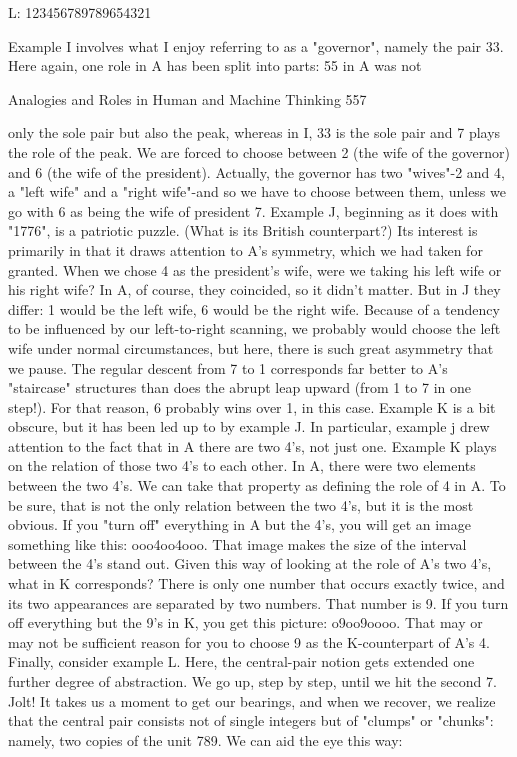        L:    123456789789654321

       Example I involves what I enjoy referring to as a "governor", namely the pair
33. Here again, one role in A has been split into parts: 55 in A was not




Analogies and Roles in Human and Machine Thinking                                  557

only the sole pair but also the peak, whereas in I, 33 is the sole pair and 7 plays the
role of the peak. We are forced to choose between 2 (the wife of the governor) and 6
(the wife of the president). Actually, the governor has two "wives"-2 and 4, a "left
wife" and a "right wife"-and so we have to choose between them, unless we go with 6
as being the wife of president 7.
        Example J, beginning as it does with "1776", is a patriotic puzzle. (What is its
British counterpart?) Its interest is primarily in that it draws attention to A's
symmetry, which we had taken for granted. When we chose 4 as the president's wife,
were we taking his left wife or his right wife? In A, of course, they coincided, so it
didn't matter. But in J they differ: 1 would be the left wife, 6 would be the right wife.
Because of a tendency to be influenced by our left-to-right scanning, we probably
would choose the left wife under normal circumstances, but here, there is such great
asymmetry that we pause. The regular descent from 7 to 1 corresponds far better to
A's "staircase" structures than does the abrupt leap upward (from 1 to 7 in one step!).
For that reason, 6 probably wins over 1, in this case.
        Example K is a bit obscure, but it has been led up to by example J. In
particular, example j drew attention to the fact that in A there are two 4's, not just one.
Example K plays on the relation of those two 4's to each other. In A, there were two
elements between the two 4's. We can take that property as defining the role of 4 in A.
To be sure, that is not the only relation between the two 4's, but it is the most obvious.
If you "turn off" everything in A but the 4's, you will get an image something like
this: ooo4oo4ooo. That image makes the size of the interval between the 4's stand out.
Given this way of looking at the role of A's two 4's, what in K corresponds? There is
only one number that occurs exactly twice, and its two appearances are separated by
two numbers. That number is 9. If you turn off everything but the 9's in K, you get
this picture: o9oo9oooo. That may or may not be sufficient reason for you to choose 9
as the K-counterpart of A's 4.
        Finally, consider example L. Here, the central-pair notion gets extended one
further degree of abstraction. We go up, step by step, until we hit the second 7. Jolt! It
takes us a moment to get our bearings, and when we recover, we realize that the
central pair consists not of single integers but of "clumps" or "chunks": namely, two
copies of the unit 789. We can aid the eye this way:

